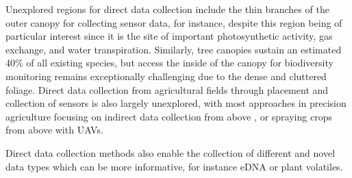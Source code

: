 Unexplored regions for direct data collection include the thin branches of the outer canopy for collecting sensor data, for instance, despite this region being of particular interest since it is the site of important photosynthetic activity, gas exchange, and water transpiration. 
Similarly, tree canopies sustain an estimated 40\% of all existing species, but access the inside of the canopy for biodiversity monitoring remains exceptionally challenging due to the dense and cluttered foliage. %
Direct data collection from agricultural fields through placement and collection of sensors is also largely unexplored, with most approaches in precision agriculture focusing on indirect data collection from above \cite{Zhang2022}, or spraying crops from above with UAVs\cite{Tsouros2019}.

Direct data collection methods also enable the collection of different and novel data types which can be more informative, for instance eDNA or plant volatiles.



